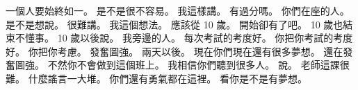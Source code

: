 \hypertarget{c01:cue:352}{}一個人要始終如一。
\hypertarget{c01:cue:353}{}是不是很不容易。
\hypertarget{c01:cue:354}{}我這樣講。
\hypertarget{c01:cue:355}{}有過分嗎。
\hypertarget{c01:cue:356}{}你們在座的人。
\hypertarget{c01:cue:357}{}是不是想說。
\hypertarget{c01:cue:358}{}很難講。
\hypertarget{c01:cue:359}{}我這個想法。
\hypertarget{c01:cue:360}{}應該從 10 歲。
\hypertarget{c01:cue:361}{}開始卻有了吧。
\hypertarget{c01:cue:362}{}10 歲也結束不懂事。
\hypertarget{c01:cue:363}{}10 歲以後說。
\hypertarget{c01:cue:364}{}我旁邊的人。
\hypertarget{c01:cue:365}{}每次考試的考度好。
\hypertarget{c01:cue:366}{}你把你考試的考度好。
\hypertarget{c01:cue:367}{}你把你考慮。
\hypertarget{c01:cue:368}{}發奮圖強。
\hypertarget{c01:cue:369}{}兩天以後。
\hypertarget{c01:cue:370}{}現在你們現在還有很多夢想。
\hypertarget{c01:cue:371}{}還在發奮圖強。
\hypertarget{c01:cue:372}{}不然你不會做到這個班上。
\hypertarget{c01:cue:373}{}我相信你們聽到很多人。
\hypertarget{c01:cue:374}{}說。
\hypertarget{c01:cue:375}{}老師這課很難。
\hypertarget{c01:cue:376}{}什麼謠言一大堆。
\hypertarget{c01:cue:377}{}你們還有勇氣都在這裡。
\hypertarget{c01:cue:378}{}看你是不是有夢想。

